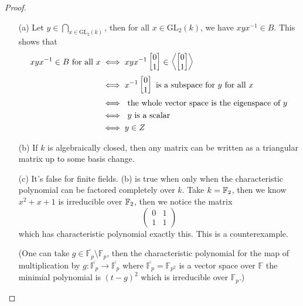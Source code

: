 \begin{proof}
    \begin{itemize}
        \item[(a)] Let $y\in \bigcap_{x \in \text{GL}_2(k)}$, then for all $x\in\text{GL}_2(k)$, we have $xyx^{-1}\in B$. This shows that 
        \begin{align*}
            xyx^{-1}\in B\text{ for all }x&\iff xyx^{-1}\begin{bmatrix}
                0\\
                1
            \end{bmatrix}\in\left\langle\begin{bmatrix}
                0\\
                1
            \end{bmatrix}\right\rangle\\
            &\iff x^{-1}\begin{bmatrix}
                0\\
                1
            \end{bmatrix}
            \text{ is a subspace for } y \text{ for all }x\\
            &\iff \text{ the whole vector space is the eigenspace of }y\\
            &\iff \text{ $y$ is a scalar}\\
            &\iff y\in Z  
        \end{align*}
        \item[(b)] If $k$ is algebraically closed, then any matrix can be written as a triangular matrix up to some basis change.
        \item[(c)] It's false for finite fields. (b) is true when only when the characteristic polynomial can be factored completely over $k$. 
        Take $k=\mathbb{F}_2$, then we know $x^2+x+1$ is irreducible over $\mathbb{F}_2$, then we notice the matrix 
        \begin{equation*}
            \begin{pmatrix}
                0&1\\
                1&1
            \end{pmatrix}
        \end{equation*}
        which has characteristic polynomial exactly this. This is a counterexample.

        (One can take $g\in\overline{\mathbb{F}_p}\setminus\mathbb{F}_p$, then the characteristic polynomial for the map of multiplication by $g:\overline{\mathbb{F}_p}\to \overline{\mathbb{F}_p}$ where $\overline{\mathbb{F}_p}=\mathbb{F}_{p^2}$ is a vector space over $\mathbb{F}$ the minimial polynomial is $(t-g)^2$ which is irreducible over $\mathbb{F}_p$.)
    \end{itemize}
\end{proof}

